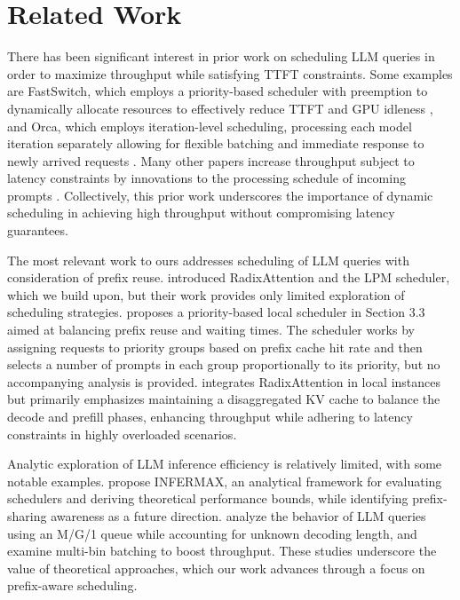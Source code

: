 \section{Related Work}
There has been significant interest in prior work on scheduling LLM queries in order to maximize throughput while satisfying TTFT constraints. Some examples are FastSwitch, which employs a priority-based scheduler with preemption to dynamically allocate resources to effectively reduce TTFT and GPU idleness \cite{shen2024fastswitch}, and Orca, which employs iteration-level scheduling, processing each model iteration separately allowing for flexible batching and immediate response to newly arrived requests \cite{yu2022orca}. Many other papers increase throughput subject to latency constraints by innovations to the processing schedule of incoming prompts \cite{zhong2024distserve, patel2024splitwise, jain2024intelligent, agrawal2024taming}. Collectively, this prior work underscores the importance of dynamic scheduling in achieving high throughput without compromising latency guarantees.

The most relevant work to ours addresses scheduling of LLM queries with consideration of prefix reuse. \citet{zheng2024sglang} introduced RadixAttention and the LPM scheduler, which we build upon, but their work provides only limited exploration of scheduling strategies. \citet{srivatsa2024preble} proposes a priority-based local scheduler in Section 3.3 aimed at balancing prefix reuse and waiting times. The scheduler works by assigning requests to priority groups based on prefix cache hit rate and then selects a number of prompts in each group proportionally to its priority, but no accompanying analysis is provided. \citet{qin2024mooncake} integrates RadixAttention in local instances but primarily emphasizes maintaining a disaggregated KV cache to balance the decode and prefill phases, enhancing throughput while adhering to latency constraints in highly overloaded scenarios.

Analytic exploration of LLM inference efficiency is relatively limited, with some notable examples. \citet{kim2024effect} propose INFERMAX, an analytical framework for evaluating schedulers and deriving theoretical performance bounds, while identifying prefix-sharing awareness as a future direction. \citet{yang2024queueing} analyze the behavior of LLM queries using an M/G/1 queue while accounting for unknown decoding length, and \citet{guldogan2024multi} examine multi-bin batching to boost throughput. These studies underscore the value of theoretical approaches, which our work advances through a focus on prefix-aware scheduling.